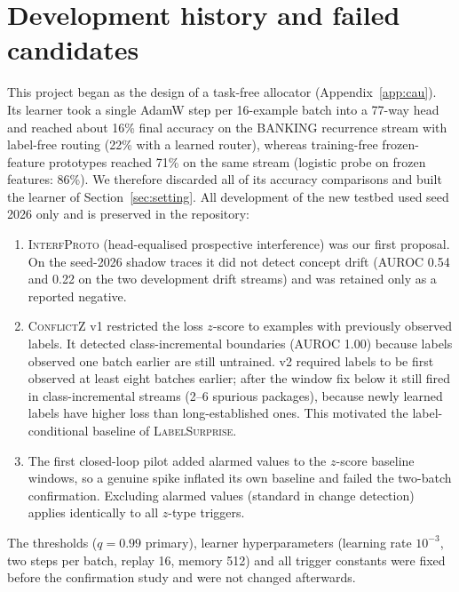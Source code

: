 \documentclass[10pt]{article}
\newcommand{\ls}{\textsc{LabelSurprise}}
\begin{document}
\section{Development history and failed candidates}
\label{app:history}
This project began as the design of a task-free allocator (Appendix~\ref{app:cau}). Its learner took a single AdamW step per 16-example batch into a 77-way head and reached about 16\% final accuracy on the BANKING recurrence stream with label-free routing (22\% with a learned router), whereas training-free frozen-feature prototypes reached 71\% on the same stream (logistic probe on frozen features: 86\%). We therefore discarded all of its accuracy comparisons and built the learner of Section~\ref{sec:setting}. All development of the new testbed used seed 2026 only and is preserved in the repository:
\begin{enumerate}
\item \textsc{InterfProto} (head-equalised prospective interference) was our first proposal. On the seed-2026 shadow traces it did not detect concept drift (AUROC 0.54 and 0.22 on the two development drift streams) and was retained only as a reported negative.
\item \textsc{ConflictZ} v1 restricted the loss $z$-score to examples with previously observed labels. It detected class-incremental boundaries (AUROC 1.00) because labels observed one batch earlier are still untrained. v2 required labels to be first observed at least eight batches earlier; after the window fix below it still fired in class-incremental streams (2--6 spurious packages), because newly learned labels have higher loss than long-established ones. This motivated the label-conditional baseline of \ls{}.
\item The first closed-loop pilot added alarmed values to the $z$-score baseline windows, so a genuine spike inflated its own baseline and failed the two-batch confirmation. Excluding alarmed values (standard in change detection) applies identically to all $z$-type triggers.
\end{enumerate}
The thresholds ($q=0.99$ primary), learner hyperparameters (learning rate $10^{-3}$, two steps per batch, replay 16, memory 512) and all trigger constants were fixed before the confirmation study and were not changed afterwards.
\end{document}
